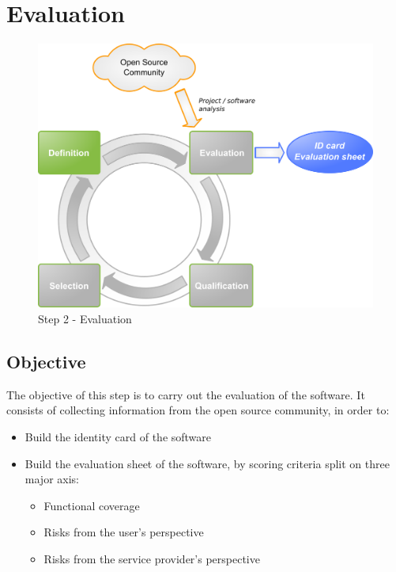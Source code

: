 %
\section{Evaluation}
\begin{figure}
\center
\includegraphics[width=13cm]{images/evaluer}
\caption{Step 2 - Evaluation}
\end{figure}


\subsection{Objective}
The objective of this step is to carry out the evaluation of the software. It consists of collecting information from the open source community, in order to:

\begin{itemize}
\item Build the identity card of the software
\item Build the evaluation sheet of the software, by scoring criteria split on three major axis:
  \begin{itemize}
  \item Functional coverage
  \item Risks from the user's perspective
  \item Risks from the service provider's perspective
  \end{itemize}
\end{itemize}

